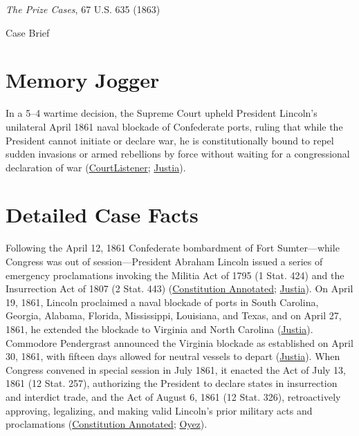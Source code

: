 \documentclass[12pt]{article}
\begin{document}
\begin{center}
{\LARGE \textit{The Prize Cases}, 67 U.S. 635 (1863)\par}
\vspace{0.8em}
{\large Case Brief\par}
\end{center}
\vspace{1em}

\section{Memory Jogger}

In a 5--4 wartime decision, the Supreme Court upheld President Lincoln's unilateral April 1861 naval blockade of Confederate ports, ruling that while the President cannot initiate or declare war, he is constitutionally bound to repel sudden invasions or armed rebellions by force without waiting for a congressional declaration of war (\href{https://www.courtlistener.com/opinion/87541/the-brig-amy-warwick/}{CourtListener}; \href{https://supreme.justia.com/cases/federal/us/67/635/}{Justia}).

\section{Detailed Case Facts}

Following the April 12, 1861 Confederate bombardment of Fort Sumter---while Congress was out of session---President Abraham Lincoln issued a series of emergency proclamations invoking the Militia Act of 1795 (1 Stat. 424) and the Insurrection Act of 1807 (2 Stat. 443) (\href{https://www.law.cornell.edu/constitution-conan/article-1/section-8/clause-1/civil-war-war-powers-and-the-prize-cases}{Constitution Annotated}; \href{https://supreme.justia.com/cases/federal/us/67/635/}{Justia}). On April 19, 1861, Lincoln proclaimed a naval blockade of ports in South Carolina, Georgia, Alabama, Florida, Mississippi, Louisiana, and Texas, and on April 27, 1861, he extended the blockade to Virginia and North Carolina (\href{https://supreme.justia.com/cases/federal/us/67/635/}{Justia}). Commodore Pendergrast announced the Virginia blockade as established on April 30, 1861, with fifteen days allowed for neutral vessels to depart (\href{https://supreme.justia.com/cases/federal/us/67/635/}{Justia}). When Congress convened in special session in July 1861, it enacted the Act of July 13, 1861 (12 Stat. 257), authorizing the President to declare states in insurrection and interdict trade, and the Act of August 6, 1861 (12 Stat. 326), retroactively approving, legalizing, and making valid Lincoln's prior military acts and proclamations (\href{https://www.law.cornell.edu/constitution-conan/article-1/section-8/clause-1/civil-war-war-powers-and-the-prize-cases}{Constitution Annotated}; \href{https://www.oyez.org/cases/1850-1900/67us635}{Oyez}).
\end{document}
